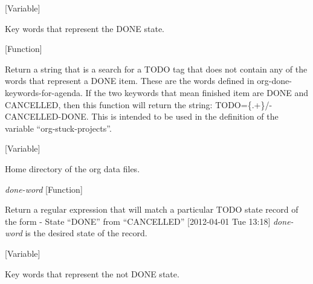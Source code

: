 \vspace{1em}
\noindent
{}
\usebox{\funcname}
 \hfill [Variable]

\begin{doc-string}
Key words that represent the DONE state.
\end{doc-string}

\vspace{1em}
\noindent
{}
\usebox{\funcname}
 \hfill [Function]

\begin{doc-string}
Return a string that is a search for a TODO tag that does not contain any of the
words that represent a DONE item.  These are the words defined in org-done-keywords-for-agenda.
If the two keywords that mean finished item are DONE and CANCELLED, then this function will
return the string: TODO=\{.+\}/-CANCELLED-DONE.  This is intended to be used in the definition
of the variable ``org-stuck-projects''.
\end{doc-string}

\vspace{1em}
\noindent
{}
\usebox{\funcname}
 \hfill [Variable]

\begin{doc-string}
Home directory of the org data files.
\end{doc-string}

\vspace{1em}
\noindent
{}
\usebox{\funcname}\emph{done-word}
 \hfill [Function]

\begin{doc-string}
Return a regular expression that will match a particular TODO state record of the form
   - State ``DONE''       from ``CANCELLED''  [2012-04-01 Tue 13:18]
  \emph{done-word} is the desired state of the record.
\end{doc-string}

\vspace{1em}
\noindent
{}
\usebox{\funcname}
 \hfill [Variable]

\begin{doc-string}
Key words that represent the not DONE state.
\end{doc-string}

